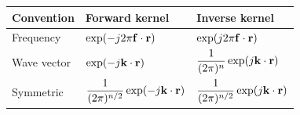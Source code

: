 \begin{center}
\begin{tabular}{lll}
\toprule
Convention & Forward kernel & Inverse kernel\\
\midrule

Frequency
&
$\exp(-j2\pi\mathbf{f}\cdot\mathbf{r})$
&
$\exp(j2\pi\mathbf{f}\cdot\mathbf{r})$

\\[0.4cm]

Wave vector
&
$\exp(-j\mathbf{k}\cdot\mathbf{r})$
&
$\dfrac{1}{(2\pi)^n}\exp(j\mathbf{k}\cdot\mathbf{r})$

\\[0.4cm]

Symmetric
&
$\dfrac{1}{(2\pi)^{n/2}}
\exp(-j\mathbf{k}\cdot\mathbf{r})$
&
$\dfrac{1}{(2\pi)^{n/2}}
\exp(j\mathbf{k}\cdot\mathbf{r})$

\\

\bottomrule
\end{tabular}
\end{center}